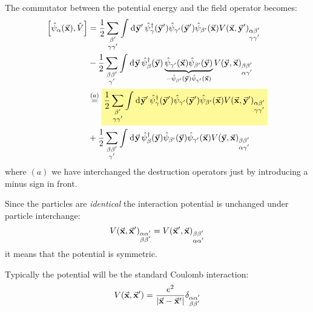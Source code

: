 \documentclass[../main/main.tex]{subfiles}
\begin{document}
The commutator between the potential energy and the field operator becomes:
\begin{equation*}
\begin{split}
  \qty[\hat{\psi }_ \alpha (\va{x}), \hat{V}  ] &= \frac{1}{2}
  \sum_{\substack{\beta'  \\ \gamma  \gamma'  } }^{}
  \int_{}^{} \dd[]{\va{y}'}
\hat{\psi }_ \gamma ^\dag (\va{y}')  \hat{\psi }_ {\gamma'}  (\va{y}') \hat{\psi }_{\beta'} (\va{x}) V(\va{x},\va{y}')_{\substack{ \alpha \beta' \\ \gamma  \gamma'  } } \\
    &- \frac{1}{2} \sum_{\substack{\beta \beta'  \\   \gamma'  } }^{}
\int_{}^{} \dd[]{\va{y}} \hat{\psi }_ \beta ^\dag (\va{y})
\underbrace{\hat{\psi }_{\gamma' } (\va{x}) \hat{\psi }_{\beta'} (\va{y})}_{- \hat{\psi }_{\beta'} (\va{y}) \hat{\psi }_{\gamma' } (\va{x})  }  V(\va{y},\va{x})_{\substack{\beta \beta' \\ \alpha  \gamma'   } }  \\
&\overset{(a)}{=}  \mathcolorbox{yellow!40}{
\frac{1}{2}
\sum_{\substack{\beta'  \\ \gamma  \gamma'  } }^{}
\int_{}^{} \dd[]{\va{y}'}
\hat{\psi }_ \gamma ^\dag (\va{y}')  \hat{\psi }_ {\gamma'}  (\va{y}') \hat{\psi }_{\beta'} (\va{x}) V(\va{x},\va{y}')_{\substack{ \alpha \beta' \\ \gamma  \gamma'  } }
}
\\
    &+ \frac{1}{2} \sum_{\substack{\beta \beta'  \\   \gamma'  } }^{}
\int_{}^{} \dd[]{\va{y}} \hat{\psi }_ \beta ^\dag (\va{y})
 \hat{\psi }_{\beta'} (\va{y}) \hat{\psi }_{\gamma' } (\va{x})  V(\va{y},\va{x})_{\substack{\beta \beta' \\ \alpha  \gamma'   } }
\end{split}
\end{equation*}
where \( (a) \) we have interchanged the destruction operators just by introducing a minus sign in front.

Since the particles are \emph{identical} the interaction potential is unchanged under particle interchange:
\begin{equation}
  V(\va{x},\va{x}')_{\substack{ \alpha \alpha'  \\ \beta \beta' } } = V(\va{x}',\va{x})_{\substack{ \beta \beta'  \\ \alpha \alpha' } }
\end{equation}
it means that the potential is symmetric.
\begin{remark}
    Typically the potential will be the standard Coulomb interaction:
\begin{equation*}
    V(\va{x},\va{x}') = \frac{e^2}{\abs{\va{x}-\va{x}'} } \delta_{\substack{ \alpha \alpha'  \\ \beta \beta' } }
  \end{equation*}
\end{remark}
\end{document}
